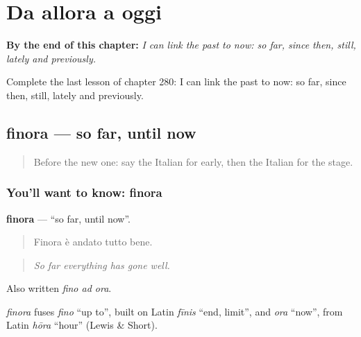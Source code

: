 
\chapter{Da allora a oggi}
\label{ch:it-da-allora-a-oggi}

\begin{chapteropening}
\textbf{By the end of this chapter:} \emph{I can link the past to now: so far, since then, still, lately and previously.}

Complete the last lesson of chapter 280: I can link the past to now: so far, since then, still, lately and previously.
\end{chapteropening}

\section[finora]{finora — so far, until now}

\label{lesson:IT-C280-finora}



\begin{quote}
Before the new one: say the Italian for early, then the Italian for the stage.
\end{quote}

\subsection*{You'll want to know: finora}
\textbf{finora} — \textquotedblleft{}so far, until now\textquotedblright{}.

\begin{quote}
Finora è andato tutto bene.
\end{quote}

\begin{quote}
\emph{So far everything has gone well.}
\end{quote}

Also written \emph{fino ad ora}.

\begin{cousinweb}
\emph{finora} fuses \emph{fino} \textquotedblleft{}up to\textquotedblright{}, built on Latin \emph{fīnis} \textquotedblleft{}end, limit\textquotedblright{}, and \emph{ora} \textquotedblleft{}now\textquotedblright{}, from Latin \emph{hōra} \textquotedblleft{}hour\textquotedblright{} (Lewis \& Short).
\end{cousinweb}

